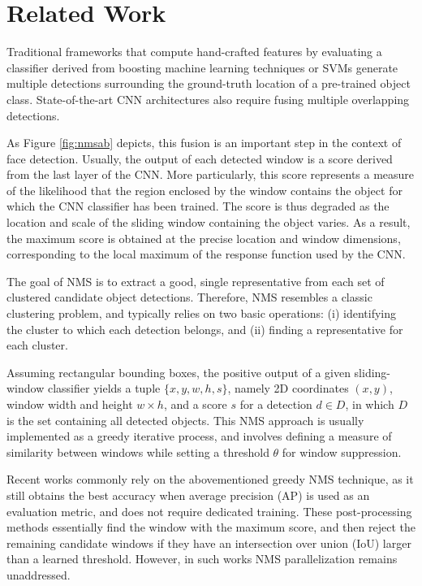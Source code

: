 \section{Related Work}
\label{sec:rwork}

Traditional frameworks that compute hand-crafted features by evaluating a classifier derived from boosting machine learning techniques \cite{schapire2003boosting} or 
SVMs \cite{cortes1995support} generate multiple detections surrounding the ground-truth location of a pre-trained object class. State-of-the-art CNN architectures 
also require fusing multiple overlapping detections.

As Figure \ref{fig:nmsab} depicts, this fusion is an important step in the context of face detection. Usually, the output of each detected window 
is a score derived from the last layer of the CNN. More particularly, this score represents a measure of the likelihood that the region enclosed by the window contains 
the object for which the CNN classifier has been trained. The score is thus degraded as the location and scale of the sliding window containing the object varies. 
As a result, the maximum score is obtained at the precise location and window dimensions, corresponding to the local maximum of the response function used by the CNN.

The goal of NMS is to extract a good, single representative from each set of clustered candidate object detections. Therefore, NMS resembles a classic clustering 
problem, and typically relies on two basic operations: (i) identifying the cluster to which each detection belongs, and (ii) finding a representative for each cluster.

Assuming rectangular bounding boxes, the positive output of a given sliding-window classifier yields a tuple $\{x, y, w, h, s\}$, namely 2D coordinates $(x,y)$, window 
width and height $w \times h$, and a score $s$ for a detection $d \in D$, in which $D$ is the set containing all detected objects. This NMS approach is usually implemented 
as a greedy iterative process, and involves defining a measure of similarity between windows while setting a threshold $\theta$ for window suppression.

Recent works \cite{bodla2017soft,liu2019adaptive,salscheider2020featurenms} commonly rely on the abovementioned greedy NMS technique, as it still obtains 
the best accuracy when average precision (AP) is used as an evaluation metric, and does not require dedicated training. These post-processing methods essentially 
find the window with the maximum score, and then reject the remaining candidate windows if they have an intersection over union (IoU) larger than a learned threshold. 
However, in such works NMS parallelization remains unaddressed. 

